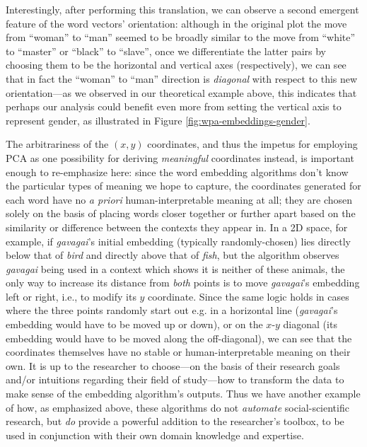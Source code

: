 \documentclass[11pt]{article}
\begin{document}
Interestingly, after performing this translation, we can observe a second emergent feature of the word vectors' orientation: although in the original plot the move from ``woman'' to ``man'' seemed to be broadly similar to the move from ``white'' to ``master'' or ``black'' to ``slave'', once we differentiate the latter pairs by choosing them to be the horizontal and vertical axes (respectively), we can see that in fact the ``woman'' to ``man'' direction is \textit{diagonal} with respect to this new orientation---as we observed in our theoretical example above, this indicates that perhaps our analysis could benefit even more from setting the vertical axis to represent gender, as illustrated in Figure \ref{fig:wpa-embeddings-gender}.

%

The arbitrariness of the $(x,y)$ coordinates, and thus the impetus for employing PCA as one possibility for deriving \textit{meaningful} coordinates instead, is important enough to re-emphasize here: since the word embedding algorithms don't know the particular types of meaning we hope to capture, the coordinates generated for each word have no \textit{a priori} human-interpretable meaning at all; they are chosen solely on the basis of placing words closer together or further apart based on the similarity or difference between the contexts they appear in. In a 2D space, for example, if \textit{gavagai}'s initial embedding (typically randomly-chosen) lies directly below that of \textit{bird} and directly above that of \textit{fish}, but the algorithm observes \textit{gavagai} being used in a context which shows it is neither of these animals, the only way to increase its distance from \textit{both} points is to move \textit{gavagai}'s embedding left or right, i.e., to modify its $y$ coordinate. Since the same logic holds in cases where the three points randomly start out e.g. in a horizontal line (\textit{gavagai}'s embedding would have to be moved up or down), or on the $x$-$y$ diagonal (its embedding would have to be moved along the off-diagonal), we can see that the coordinates themselves have no stable or human-interpretable meaning on their own. It is up to the researcher to choose---on the basis of their research goals and/or intuitions regarding their field of study---how to transform the data to make sense of the embedding algorithm's outputs. Thus we have another example of how, as emphasized above, these algorithms do not \textit{automate} social-scientific research, but \textit{do} provide a powerful addition to the researcher's toolbox, to be used in conjunction with their own domain knowledge and expertise.
\end{document}
